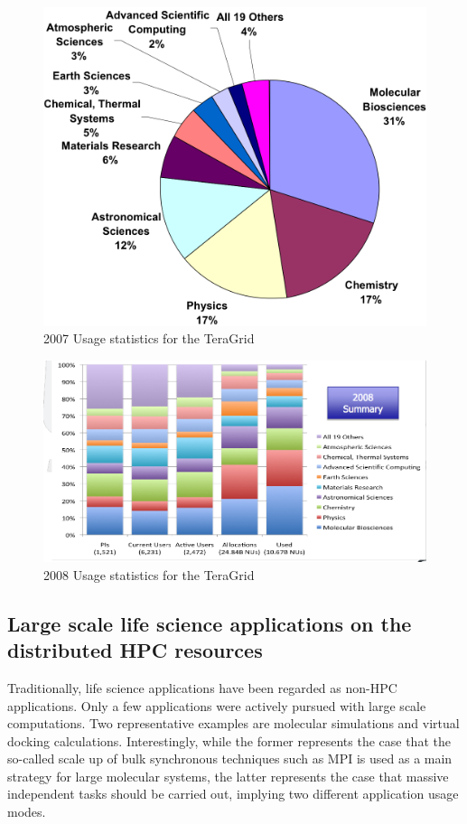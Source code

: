 \documentclass{sig-alternate}
\begin{document}


\begin{figure}
 \centering
\includegraphics[scale=0.40]{figures/teragrid-discipline07}
\caption{\small 2007 Usage statistics for the TeraGrid} 
  \label{tg2007}
\end{figure}


\begin{figure}
 \centering
\includegraphics[scale=0.27]{figures/teragrid-discipline08}
\caption{\small 2008 Usage statistics for the TeraGrid}
  \label{tg2008}
\end{figure}


\subsection{Large scale life science applications on the distributed HPC resources}
Traditionally, life science applications have been regarded as non-HPC
applications.  Only a few applications were actively pursued with
large scale computations.  Two representative examples are molecular
simulations and virtual docking calculations.  Interestingly, while
the former represents the case that the so-called scale up of bulk
synchronous techniques such as MPI is used as a main strategy for
large molecular systems, the latter represents the case that massive
independent tasks should be carried out, implying two different
application usage modes.
\end{document}
